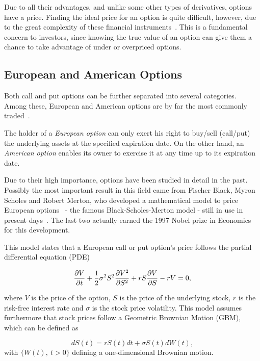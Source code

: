 \documentclass[a4paper,twocolumn,aps,prd,longbibliography,superscriptaddress]{revtex4-1}
\begin{document}
Due to all their advantages, and unlike some other types of derivatives, options have a price. Finding the ideal price for an option is quite difficult, however, due to the great complexity of these financial instruments~\citep{Hull}. This is a fundamental concern to investors, since knowing the true value of an option can give them a chance to take advantage of under or overpriced options.




\subsection{European and American Options}
Both call and put options can be further separated into several categories. Among these, European and American options are by far the most commonly traded~\cite{Hull}.

The holder of a \textit{European option} can only exert his right to buy/sell (call/put) the underlying assets at the specified expiration date.
On the other hand, an \textit{American option} enables its owner to exercise it at any time up to its expiration date.



Due to their high importance, options have been studied in detail in the past.
Possibly the most important result in this field came from Fischer Black, Myron Scholes and Robert Merton, who developed a mathematical model to price European options~\cite{Scholes} - the famous Black-Scholes-Merton model - still in use in present days~\cite{Hull}. The last two actually earned the 1997 Nobel prize in Economics for this development.

This model states that a European call or put option's price follows the partial differential equation (PDE)

\begin{equation}\label{BS2}
\pdv{V}{t}+\frac{1}{2}\sigma^2S^2\pdv{V^2}{S^2}+rS\pdv{V}{S}-rV=0,
\end{equation}

\noindent where $V$ is the price of the option, $S$ is the price of the underlying stock, $r$ is the risk-free interest rate and $\sigma$ is the stock price volatility.
This model assumes furthermore that stock prices follow a Geometric Brownian Motion (GBM), which can be defined as

\begin{equation}\label{BS}
dS(t)=rS(t)dt+\sigma S(t)dW(t),
\end{equation}
\noindent with $\{W(t),\ t>0\}$ defining a one-dimensional Brownian motion.
\end{document}
